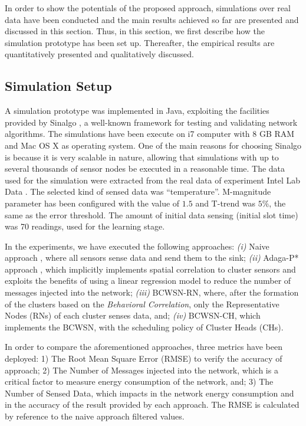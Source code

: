 \documentclass[conference]{IEEEtran}
\begin{document}
In order to show the potentials of the proposed approach, simulations over real
data have been conducted and the main results achieved so far are presented and
discussed in this section. Thus, in this section, we first describe how the
simulation prototype has been set up. Thereafter, the empirical results are
quantitatively presented and qualitatively discussed.

\subsection{Simulation Setup}
\label{data-and-experiments}

A simulation prototype was implemented in Java, exploiting the facilities
provided by Sinalgo \cite{Sinalgo2007}, a well-known framework for testing and
validating network algorithms. The simulations have been execute on i7 computer
with 8 GB RAM and Mac OS X as operating system.
One of the main reasons for choosing Sinalgo is because it is very scalable in
nature, allowing that simulations with up to several thousands of sensor nodes
be executed in a reasonable time. The data used for the simulation were
extracted from the real data of experiment Intel Lab Data \cite{Intel2004}. The
selected kind of sensed data was ``temperature''. M-magnitude parameter has been
configured with the value of $1.5$ and T-trend was $5\%$, the same as the error
threshold. The amount of initial data sensing (initial slot time) was 70
readings, used for the learning stage.

In the experiments, we have executed the following approaches: {\it
  (i)} Naive approach \cite{Madden2005}, where all sensors sense data
and send them to the sink;  {\it
  (ii)} Adaga-P* approach \cite{MaiaACR2013} \cite{MaiaSAC2013}, which
implicitly implements spatial correlation to cluster sensors and exploits the
benefits of using a linear  regression model to reduce the number of messages
injected into the network;  {\it
  (iii)} BCWSN-RN, where, after the formation of the clusters based on the
\textit{Behavioral Correlation}, only the Representative Nodes (RNs) of each
cluster senses data, and;  {\it
  (iv)} BCWSN-CH, which implements the BCWSN, with the scheduling
policy  of  Cluster Heads (CHs).

In order to compare the aforementioned approaches, three metrics have been
deployed: 1) The Root Mean Square Error (RMSE)  to verify the accuracy of
approach; 2) The Number of Messages injected into the network, which is a
critical factor to measure energy consumption of the network, and; 3) The
Number of Sensed Data, which impacts in the network energy consumption and in
the accuracy of the result provided by each approach. The RMSE is calculated by
reference to the naive approach filtered values.
\end{document}
